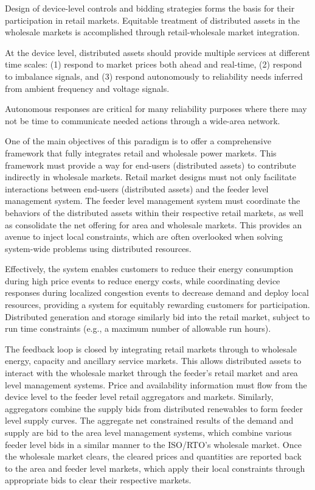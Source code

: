 Design of device-level controls and bidding strategies forms the basis for their participation in retail markets. Equitable treatment of distributed assets in the wholesale markets is accomplished through retail-wholesale market integration.

At the device level, distributed assets should provide multiple services at different time scales: (1) respond to market prices both ahead and real-time, (2) respond to imbalance signals, and (3) respond autonomously to reliability needs inferred from ambient frequency and voltage signals.

Autonomous responses are critical for many reliability purposes where there may not be time to
communicate needed actions through a wide-area network.

One of the main objectives of this paradigm is to offer a comprehensive framework that fully integrates retail and wholesale power markets. This framework must provide a way for end-users (distributed assets) to contribute indirectly in wholesale markets. Retail market designs must not only facilitate interactions between end-users (distributed assets) and the feeder level management system. The feeder level management system must coordinate the behaviors of the distributed assets within their respective retail markets, as well as consolidate the net offering for area and wholesale markets. This provides an avenue to inject local constraints, which are often overlooked when solving system-wide problems using distributed resources.

Effectively, the system enables customers to reduce their energy consumption during high price events to reduce energy costs, while coordinating device responses during localized congestion events to decrease demand and deploy local resources, providing a system for equitably rewarding customers for participation. Distributed generation and storage similarly bid into the retail market, subject to run time constraints (e.g., a maximum number of allowable
run hours).

The feedback loop is closed by integrating retail markets through to wholesale energy, capacity and ancillary service markets. This allows distributed assets to interact with the wholesale market through the feeder's retail market and area level management systems. Price and availability information must flow from the device level to the feeder level retail aggregators and markets. Similarly, aggregators combine the supply bids from distributed renewables to form feeder level supply curves. The aggregate net constrained results of the demand and supply are bid to the area level management systems, which combine various feeder level bids in a similar manner to the ISO/RTO's wholesale market. Once the wholesale
market clears, the cleared prices and quantities are reported back to the area and feeder level markets, which apply their local constraints through appropriate bids to clear their respective markets.

